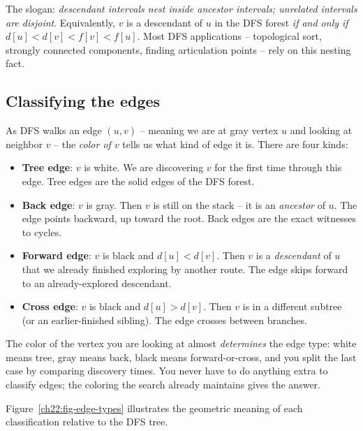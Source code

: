 \begin{focusbox}
The slogan: \emph{descendant intervals nest inside ancestor intervals; unrelated
intervals are disjoint}. Equivalently, $v$ is a descendant of $u$ in the DFS
forest \emph{if and only if} $d[u] < d[v] < f[v] < f[u]$. Most DFS
applications -- topological sort, strongly connected components, finding
articulation points -- rely on this nesting fact.
\end{focusbox}

\subsection{Classifying the edges}
\label{ch22:edge-classification}

As DFS walks an edge $(u, v)$ -- meaning we are at gray vertex $u$ and looking at
neighbor $v$ -- the \emph{color of $v$} tells us what kind of edge it
is. There are four kinds:

\begin{itemize}
\item \textbf{Tree edge}: $v$ is white. We are discovering $v$ for the first
time through this edge. Tree edges are the solid edges of the DFS forest.
\item \textbf{Back edge}: $v$ is gray. Then $v$ is still on the stack -- it is an
\emph{ancestor} of $u$. The edge points backward, up toward the root. Back edges
are the exact witnesses to cycles.
\item \textbf{Forward edge}: $v$ is black and $d[u] < d[v]$. Then $v$ is a
\emph{descendant} of $u$ that we already finished exploring by another route. The
edge skips forward to an already-explored descendant.
\item \textbf{Cross edge}: $v$ is black and $d[u] > d[v]$. Then $v$ is in a
different subtree (or an earlier-finished sibling). The edge crosses between
branches.
\end{itemize}

\begin{intuitionbox}
The color of the vertex you are looking at almost \emph{determines} the edge type:
white means tree, gray means back, black means forward-or-cross, and you split
the last case by comparing discovery times. You never have to do anything extra
to classify edges; the coloring the search already maintains gives the
answer.
\end{intuitionbox}

Figure~\ref{ch22:fig-edge-types} illustrates the geometric meaning of each classification relative to the DFS tree.

